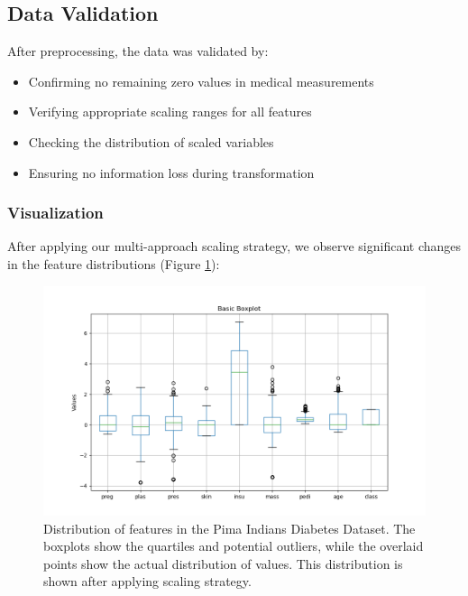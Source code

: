 \documentclass[a4paper,12pt]{article}
\begin{document}
\subsection{Data Validation}
After preprocessing, the data was validated by:
\begin{itemize}
    \item{Confirming no remaining zero values in medical measurements}
    \item{Verifying appropriate scaling ranges for all features}
    \item{Checking the distribution of scaled variables}
    \item{Ensuring no information loss during transformation}
\end{itemize}

\subsubsection{Visualization}
After applying our multi-approach scaling strategy, we observe significant changes in the feature distributions (Figure \ref{fig:scaled_distributions}):

\begin{figure}[ht]
    \centering
    \includegraphics[width=1\textwidth]{images/boxplot_after.png}
    \caption{Distribution of features in the Pima Indians Diabetes Dataset. The boxplots show the quartiles and potential outliers, while the overlaid points show the actual distribution of values. This distribution is shown after applying scaling strategy.}
    \label{fig:scaled_distributions}
\end{figure}
\newpage
\end{document}
